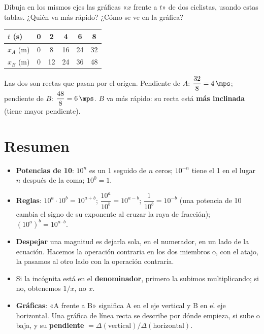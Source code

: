 \begin{exercise}
    Dibuja en los mismos ejes las gráficas «\(x\) frente a \(t\)» de dos ciclistas, usando estas tablas. ¿Quién va más rápido? ¿Cómo se ve en la gráfica?
    \begin{center}
        \begin{tabular}{lccccc}
            \toprule
            \(t\) (s) & 0 & 2 & 4 & 6 & 8 \\
            \midrule
            \(x_A\) (m) & 0 & 8 & 16 & 24 & 32 \\
            \(x_B\) (m) & 0 & 12 & 24 & 36 & 48 \\
            \bottomrule
        \end{tabular}
    \end{center}
    \begin{solu}
        Las dos son rectas que pasan por el origen. Pendiente de \(A\): \(\dfrac{32}{8} = \qty{4}{\mps}\); pendiente de \(B\): \(\dfrac{48}{8} = \qty{6}{\mps}\). \(B\) va más rápido: su recta está \textbf{más inclinada} (tiene mayor pendiente).
    \end{solu}
\end{exercise}


\section*{Resumen}

\begin{itemize}
    \item \textbf{Potencias de 10}: \(10^{n}\) es un 1 seguido de \(n\) ceros; \(10^{-n}\) tiene el 1 en el lugar \(n\) después de la coma; \(10^{0} = 1\).
    \item \textbf{Reglas}: \(10^{a} \cdot 10^{b} = 10^{a+b}\); \(\dfrac{10^{a}}{10^{b}} = 10^{a-b}\); \(\dfrac{1}{10^{b}} = 10^{-b}\) (una potencia de 10 cambia el signo de su exponente al cruzar la raya de fracción); \(\left(10^{a}\right)^{b} = 10^{a \cdot b}\).
    \item \textbf{Despejar} una magnitud es dejarla sola, en el numerador, en un lado de la ecuación. Hacemos la operación contraria en los dos miembros o, con el atajo, la pasamos al otro lado con la operación contraria.
    \item Si la incógnita está en el \textbf{denominador}, primero la subimos multiplicando; si no, obtenemos \(1/x\), no \(x\).
    \item \textbf{Gráficas}: «A frente a B» significa A en el eje vertical y B en el eje horizontal. Una gráfica de línea recta se describe por dónde empieza, si sube o baja, y su \textbf{pendiente} \(= \Delta(\text{vertical}) / \Delta(\text{horizontal})\).
\end{itemize}
